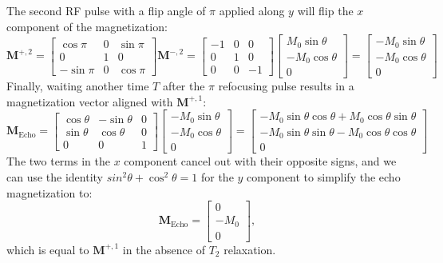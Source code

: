 \documentclass[11pt]{article}
\theoremstyle{definition}
\begin{document}
The second RF pulse with a flip angle of $\pi$ applied along $y$ will flip the $x$ component of the magnetization:
\begin{equation}
    \mathbf{M}^{+,2} = 
    \begin{bmatrix}
        \cos\pi & 0 & \sin\pi \\ 
        0 & 1 & 0 \\ 
        -\sin\pi & 0 & \cos\pi
    \end{bmatrix}\mathbf{M}^{-,2}=
    \begin{bmatrix}
        -1 & 0 & 0 \\ 
        0 & 1 & 0 \\ 
        0 & 0 & -1
    \end{bmatrix}
    \begin{bmatrix}
        M_0 \sin\theta \\ 
        -M_0 \cos\theta \\ 
        0
    \end{bmatrix}
    =
    \begin{bmatrix}
        -M_0 \sin\theta \\
        -M_0 \cos\theta \\ 
        0
    \end{bmatrix}
\end{equation}
Finally, waiting another time $T$ after the $\pi$ refocusing pulse results in a magnetization vector aligned with $\mathbf{M}^{+,1}$:
\begin{equation}
    \mathbf{M}_{\text{Echo}} = 
    \begin{bmatrix} 
        \cos\theta & -\sin\theta & 0 \\
        \sin\theta & \cos\theta & 0 \\ 
        0 & 0 & 1 
    \end{bmatrix}
    \begin{bmatrix}
        -M_0 \sin\theta \\
        -M_0 \cos\theta \\ 
        0
    \end{bmatrix}=
    \begin{bmatrix}
        -M_0 \sin\theta \cos\theta + M_0 \cos\theta \sin\theta \\
        -M_0 \sin\theta \sin\theta - M_0 \cos\theta \cos\theta \\ 
        0
    \end{bmatrix}
\end{equation}
The two terms in the $x$ component cancel out with their opposite signs, and we can use the identity $sin^2\theta + \cos^2\theta = 1$ for the $y$ component to simplify the echo magnetization to: 
\begin{equation}
    \mathbf{M}_{\text{Echo}} =
    \begin{bmatrix}
        0 \\ 
        -M_0 \\ 
        0
    \end{bmatrix},
\end{equation}
which is equal to $\mathbf{M}^{+,1}$ in the absence of $T_2$ relaxation. 
\end{document}

